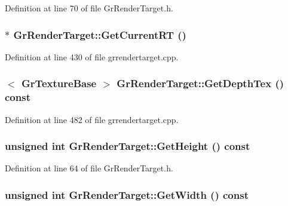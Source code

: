 \begin{CompactItemize}
Definition at line 70 of file GrRenderTarget.h.\hypertarget{class_gr_render_target_0bf3b1509691c2567d9b0f01a29f42d4}{
\subsubsection[{GetCurrentRT}]{ $\ast$ GrRenderTarget::GetCurrentRT ()}}
\label{class_gr_render_target_0bf3b1509691c2567d9b0f01a29f42d4}




Definition at line 430 of file grrendertarget.cpp.\hypertarget{class_gr_render_target_90b86b630acf5808df5402faf13cbcff}{
\subsubsection[{GetDepthTex}]{$<$ {\bf GrTextureBase} $>$ GrRenderTarget::GetDepthTex () const}}
\label{class_gr_render_target_90b86b630acf5808df5402faf13cbcff}




Definition at line 482 of file grrendertarget.cpp.\hypertarget{class_gr_render_target_e84bb1b12eaed6f272a8baeaf2fa2336}{
\subsubsection[{GetHeight}]{\setlength{\rightskip}{0pt plus 5cm}unsigned int GrRenderTarget::GetHeight () const}}
\label{class_gr_render_target_e84bb1b12eaed6f272a8baeaf2fa2336}




Definition at line 64 of file GrRenderTarget.h.\hypertarget{class_gr_render_target_fd26d9d80f5311ee65fac1b2625d4fb0}{
\subsubsection[{GetWidth}]{\setlength{\rightskip}{0pt plus 5cm}unsigned int GrRenderTarget::GetWidth () const}}
\label{class_gr_render_target_fd26d9d80f5311ee65fac1b2625d4fb0}





\end{CompactItemize}
